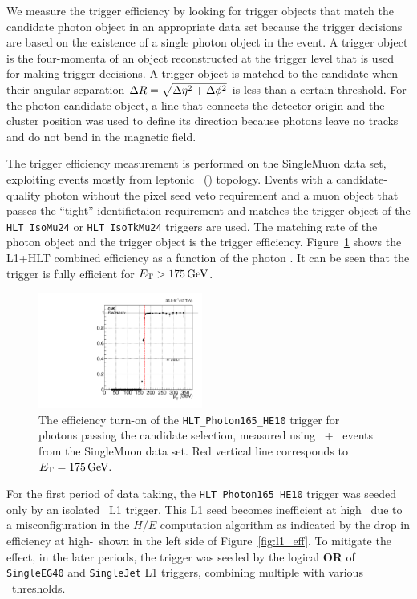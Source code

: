 We measure the trigger efficiency by looking for trigger objects that match the candidate photon object in an appropriate data set because the trigger decisions are based on the existence of a single photon object in the event.
A trigger object is the four-momenta of an object reconstructed at the trigger level that is used for making trigger decisions. 
A trigger object is matched to the candidate when their angular separation  $\Delta R = \sqrt{\Delta \eta^2 + \Delta \phi^2}$ is less than a certain threshold. 
For the photon candidate object, a line that connects the detector origin and the cluster position was used to define its direction because photons leave no tracks and do not bend in the magnetic field.

The trigger efficiency measurement is performed on the SingleMuon data set, exploiting events mostly from leptonic \ttbar\ (\Pe\Pgm) topology. 
Events with a candidate-quality photon without the pixel seed veto requirement and a muon object that passes the ``tight'' identifictaion requirement and matches the trigger object of the \texttt{HLT\_IsoMu24} or \texttt{HLT\_IsoTkMu24} triggers are used. 
The matching rate of the photon object and the trigger object is the trigger efficiency. 
Figure~\ref{fig:hlt_eff} shows the L1+HLT combined efficiency as a function of the photon \ET. 
It can be seen that the trigger is fully efficient for $E_{\mathrm{T}} > 175\,\text{Ge\hspace{-.08em}V}$.

\begin{figure}[htbp]
  \centering
  \includegraphics[width=0.48\textwidth]{Calibration/Figures/photon_elmu_sph165abs_ptzoom.pdf}
  \caption{
    The efficiency turn-on of the \texttt{HLT\_Photon165\_HE10} trigger for photons passing the candidate selection, measured using \Pgm\ + \egamma\ events from the SingleMuon data set. 
    Red vertical line corresponds to $E_{\mathrm{T}} = 175\,\text{Ge\hspace{-.08em}V}.$
  }
  \label{fig:hlt_eff}
\end{figure}

For the first period of data taking, the \texttt{HLT\_Photon165\_HE10} trigger was seeded only by an isolated \egamma\ L1 trigger. 
This L1 seed becomes inefficient at high \ET\ due to a misconfiguration in the $H/E$ computation algorithm as indicated by the drop in efficiency at high-\ET\ shown in the left side of Figure~\ref{fig:l1_eff}. 
To mitigate the effect, in the later periods, the trigger was seeded by the logical \textbf{OR} of \texttt{SingleEG40} and \texttt{SingleJet} L1 triggers, combining multiple with various \pt\ thresholds.

